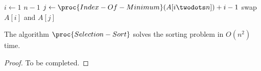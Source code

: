 \begin{codebox}
  \li \For $i \gets 1$ \To $n - 1$ \Do
  \li     $j \gets \proc{Index-Of-Minimum}(A[i \twodots n]) + i - 1$
  \li     swap $A[i]$ and $A[j]$
      \End
\end{codebox}

\begin{theorem}
  The algorithm $\proc{Selection-Sort}$ solves the sorting problem in $O(n^2)$
  time.
\end{theorem}
\begin{proof}
  To be completed.
\end{proof}